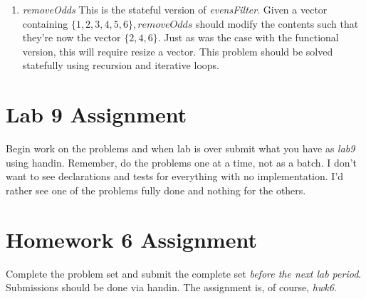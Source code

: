 \documentclass[]{tufte-handout}
\begin{document}
\begin{enumerate}
\item \textit{removeOdds} \newline
This is the stateful version of \textit{evensFilter}. Given a vector containing $\{1,2,3,4,5,6\}, \textit{removeOdds}$ should modify the contents such that they're now the vector $\{2,4,6\}$. Just as was the case with the functional version, this will require resize a vector. This problem should be solved statefully using recursion and iterative loops.

\end{enumerate}  

\section{Lab 9 Assignment}

Begin work on the problems and when lab is over submit what you have as \textit{lab9} using handin. Remember, do the problems one at a time, not as a batch. I don't want to see declarations and tests for everything with no implementation. I'd rather see one of the problems fully done and nothing for the others. 

\section{Homework 6 Assignment}

Complete the problem set and submit the complete set \textit{before the next lab period}. Submissions should be done via handin. The assignment is, of course, \textit{hwk6}.
\end{document}
